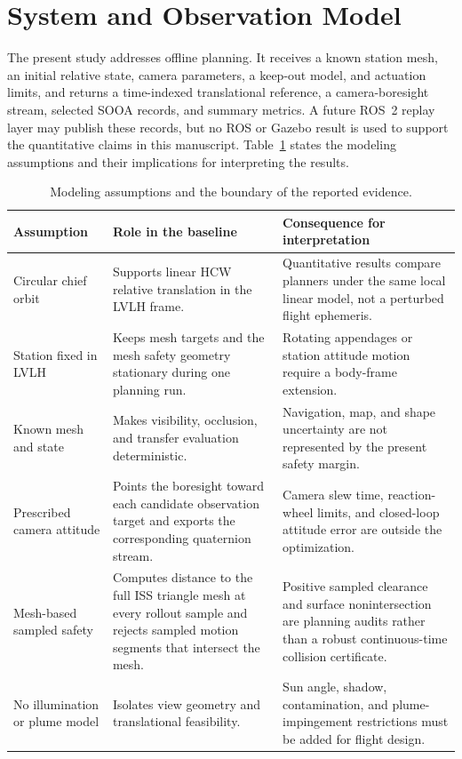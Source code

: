 \documentclass{IEEEtaes}
\theoremstyle{remark}
\theoremstyle{plain}
\begin{document}
\section{System and Observation Model}
\label{sec:system}

The present study addresses offline planning. It receives a known station mesh, an initial relative state, camera parameters, a keep-out model, and actuation limits, and returns a time-indexed translational reference, a camera-boresight stream, selected SOOA records, and summary metrics. A future ROS~2 replay layer may publish these records, but no ROS or Gazebo result is used to support the quantitative claims in this manuscript. Table~\ref{tab:assumptions} states the modeling assumptions and their implications for interpreting the results.

\begin{table}[t]
  \centering
  \caption{Modeling assumptions and the boundary of the reported evidence.}
  \label{tab:assumptions}
  \renewcommand{\arraystretch}{1.08}
  \setlength{\tabcolsep}{5pt}
  \footnotesize
  \begin{tabularx}{\textwidth}{@{}p{}p{}X@{}}
    \toprule
    Assumption & Role in the baseline & Consequence for interpretation \\
    \midrule
    Circular chief orbit & Supports linear HCW relative translation in the LVLH frame. & Quantitative results compare planners under the same local linear model, not a perturbed flight ephemeris. \\
    Station fixed in LVLH & Keeps mesh targets and the mesh safety geometry stationary during one planning run. & Rotating appendages or station attitude motion require a body-frame extension. \\
    Known mesh and state & Makes visibility, occlusion, and transfer evaluation deterministic. & Navigation, map, and shape uncertainty are not represented by the present safety margin. \\
    Prescribed camera attitude & Points the boresight toward each candidate observation target and exports the corresponding quaternion stream. & Camera slew time, reaction-wheel limits, and closed-loop attitude error are outside the optimization. \\
    Mesh-based sampled safety & Computes distance to the full ISS triangle mesh at every rollout sample and rejects sampled motion segments that intersect the mesh. & Positive sampled clearance and surface nonintersection are planning audits rather than a robust continuous-time collision certificate. \\
    No illumination or plume model & Isolates view geometry and translational feasibility. & Sun angle, shadow, contamination, and plume-impingement restrictions must be added for flight design. \\
    \bottomrule
  \end{tabularx}
\end{table}
\end{document}
